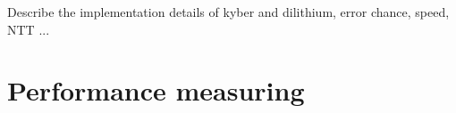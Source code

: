 Describe the implementation details of kyber and dilithium, error chance, speed, NTT ...

\section{Performance measuring}